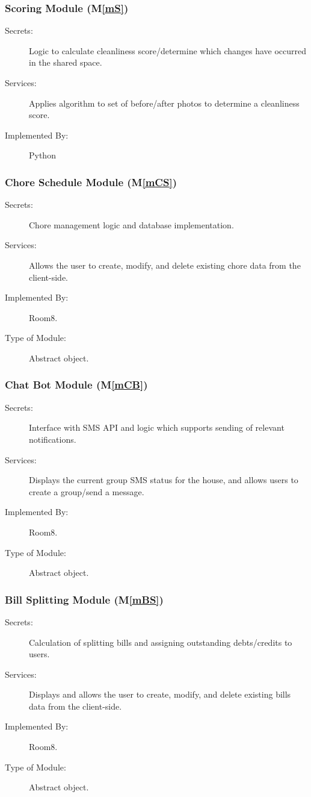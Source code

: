 \documentclass[12pt, titlepage]{article}
\newcommand{\mref}[1]{M\ref{#1}}
\begin{document}
\subsubsection{Scoring Module (\mref{mS})}

\begin{description}
\item[Secrets:] Logic to calculate cleanliness score/determine which changes have occurred in the shared space.
\item[Services:] Applies algorithm to set of before/after photos to determine a cleanliness score.
\item[Implemented By:] Python
\end{description}

\subsubsection{Chore Schedule Module (\mref{mCS})}
\begin{description}
\item[Secrets:] Chore management logic and database implementation.
\item[Services:] Allows the user to create, modify, and delete existing chore data from the client-side.
\item[Implemented By:] Room8.
\item[Type of Module:] Abstract object.
\end{description}

\subsubsection{Chat Bot Module (\mref{mCB})}
\begin{description}
\item[Secrets:] Interface with SMS API and logic which supports sending of relevant notifications.
\item[Services:] Displays the current group SMS status for the house, and allows users to create a group/send a message.
\item[Implemented By:] Room8.
\item[Type of Module:] Abstract object.
\end{description}

\subsubsection{Bill Splitting Module (\mref{mBS})}
\begin{description}
\item[Secrets:] Calculation of splitting bills and assigning outstanding debts/credits to users.
\item[Services:] Displays and allows the user to create, modify, and delete existing bills data from the client-side.
\item[Implemented By:] Room8.
\item[Type of Module:] Abstract object.
\end{description}
\end{document}
